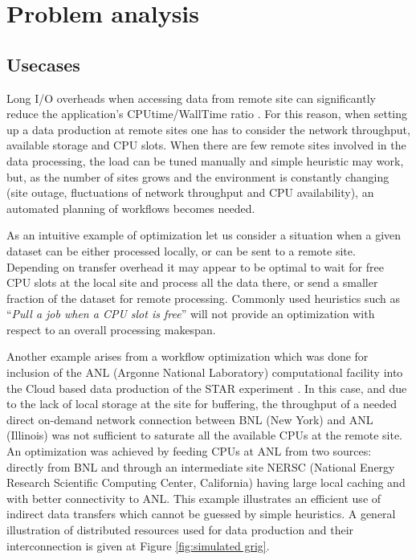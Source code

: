 \documentclass[english]{ddny}
\begin{document}
\section{Problem analysis}
\subsection{Usecases}
Long I/O overheads when accessing data from remote site can significantly reduce the application's CPUtime/WallTime ratio \cite{HorkyACAT,Betev}. For this reason, when setting up a data production at remote sites one has to consider the network throughput, available storage and CPU slots. When there are few remote sites involved in the data processing, the load can be tuned manually and simple heuristic may work, but, as the number of sites grows and the environment is constantly changing (site outage, fluctuations of network throughput and CPU availability), an automated planning of workflows becomes needed. 

As an intuitive example of optimization let us consider a situation when a given dataset can be either processed locally, or can be sent to a remote site. Depending on transfer overhead it may appear to be optimal to wait for free CPU slots at the local site and process all the data there, or send a smaller fraction of the dataset for remote processing. Commonly used heuristics such as ``\textit{Pull a job when a CPU slot is free}'' will not provide an optimization with respect to an overall processing makespan.  

Another example arises from a workflow optimization which was done for inclusion of the ANL (Argonne National Laboratory) computational facility into the Cloud based data production of the STAR experiment \cite{Balewski}. In this case, and due to the lack of local storage at the site for buffering, the throughput of a needed direct on-demand network connection between BNL (New York) and ANL (Illinois) was not sufficient to saturate all the available CPUs at the remote site. An optimization was achieved by feeding CPUs at ANL from two sources: directly from BNL and through an intermediate site NERSC (National Energy Research Scientific Computing Center, California) having large local caching and with better connectivity to ANL. This example illustrates an efficient use of indirect data transfers which cannot be guessed by simple heuristics. A general illustration of distributed resources used for data production and their interconnection is given at Figure \ref{fig:simulated grig}.
\end{document}
